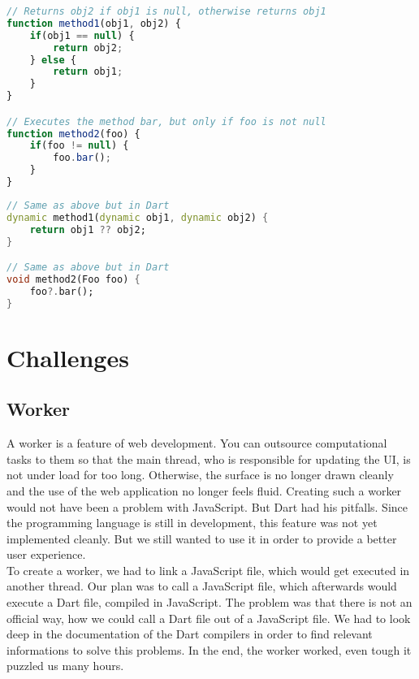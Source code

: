 \begin{lstlisting}[language=JavaScript,caption={Example in JavaScript}]
// Returns obj2 if obj1 is null, otherwise returns obj1
function method1(obj1, obj2) {
	if(obj1 == null) {
		return obj2;
	} else {
		return obj1;
	}
}

// Executes the method bar, but only if foo is not null
function method2(foo) {
	if(foo != null) {
		foo.bar();
	}
}
\end{lstlisting}

\begin{lstlisting}[language=Dart,caption={Example in Dart}]
// Same as above but in Dart
dynamic method1(dynamic obj1, dynamic obj2) {
	return obj1 ?? obj2;
}

// Same as above but in Dart
void method2(Foo foo) {
	foo?.bar();
}
\end{lstlisting}


\section{Challenges}
\subsection{Worker}
A worker is a feature of web development. You can outsource computational tasks to them so that the main thread, who is responsible for updating the UI, is not under load for too long. Otherwise, the surface is no longer drawn cleanly and the use of the web application no longer feels fluid. Creating such a worker would not have been a problem with JavaScript. But Dart had his pitfalls. Since the programming language is still in development, this feature was not yet implemented cleanly. But we still wanted to use it in order to provide a better user experience.\\
To create a worker, we had to link a JavaScript file, which would get executed in another thread. Our plan was to call a JavaScript file, which afterwards would execute a Dart file, compiled in JavaScript. The problem was that there is not an official way, how we could call a Dart file out of a JavaScript file. We had to look deep in the documentation of the Dart compilers in order to find relevant informations to solve this problems. In the end, the worker worked, even tough it puzzled us many hours.


